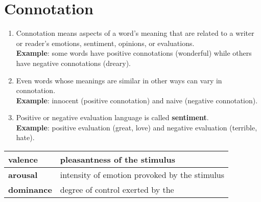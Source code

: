 \section{Connotation \cite{nlp-1}}\label{Connotation}
\begin{enumerate}
    \item Connotation means aspects of a word’s meaning that are related to a writer or reader’s emotions, sentiment, opinions, or evaluations.\\
    \textbf{Example}: some words have positive connotations (wonderful) while others have negative connotations (dreary).

    \item Even words whose meanings are similar in other ways can vary in connotation.\\
    \textbf{Example}: innocent (positive connotation) and naive (negative connotation).

    \item Positive or negative evaluation language is called \textbf{sentiment}.\\
    \textbf{Example}: positive evaluation (great, love) and negative evaluation (terrible, hate). 
\end{enumerate}

\begin{customTableWrapper}{1}
\begin{table}[h!]
    \centering
    \begin{tabular}{|l|p{7cm}|}
        \hline
        \textbf{valence} & pleasantness of the stimulus \\
        \hline
        \textbf{arousal} & intensity of emotion provoked by the stimulus \\
        \hline
        \textbf{dominance} & degree of control exerted by the \\
        \hline
    \end{tabular}
\end{table}
\end{customTableWrapper}

